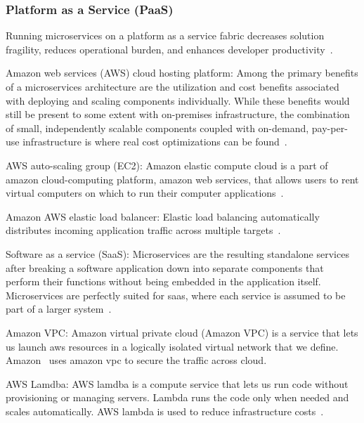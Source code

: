 \subsubsection{Platform as a Service (PaaS)}

Running microservices on a platform as a service fabric decreases solution fragility, reduces operational burden, and enhances developer productivity~\cite{rosa2018, Mikail2020}.

\par Amazon web services (AWS) cloud hosting platform: Among the primary benefits of a microservices architecture are the utilization and cost benefits associated with deploying and scaling components individually. While these benefits would still be present to some extent with on-premises infrastructure, the combination of small, independently scalable components coupled with on-demand, pay-per-use infrastructure is where real cost optimizations can be found~\cite{McElhiney2018}.

\par AWS auto-scaling group (EC2): Amazon elastic compute cloud is a part of amazon cloud-computing platform, amazon web services, that allows users to rent virtual computers on which to run their computer applications~\cite{McElhiney2018}.

\par Amazon AWS elastic load balancer: Elastic load balancing automatically distributes incoming application traffic across multiple targets~\cite{McElhiney2018}.

\par Software as a service (SaaS): Microservices are the resulting standalone services after breaking a software application down into separate components that perform their functions without being embedded in the application itself. Microservices are perfectly suited for saas, where each service is assumed to be part of a larger system~\cite{haugeland2020}.

\par Amazon VPC: Amazon virtual private cloud (Amazon VPC) is a service that lets us launch aws resources in a logically isolated virtual network that we define. Amazon~\cite{Amazon} uses amazon vpc to secure the traffic across cloud.

\par AWS Lamdba: AWS lamdba is a compute service that lets us run code without provisioning or managing servers. Lambda runs the code only when needed and scales automatically. AWS lambda is used to reduce infrastructure costs~\cite{villamizar2017}.

